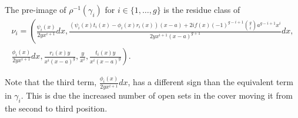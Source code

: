    \begin{prop}\label{basis22}
    The pre-image of $\rho^{-1}(\gamma_i)$ for $i \in \{1, \ldots, g\}$ is the residue class of
        \begin{multline*}
        \nu_i = \left(\frac{\psi_i(x)}{2yx^{i+1}}dx, \frac{(\psi_i(x)t_i(x) - \phi_i(x)r_i(x))(x-a) + 2if(x)(-1)^{g-i+1}\binom{g}{i} a^{g-i+1}x^i}{2yx^{i+1}(x-a)^{g+1}}dx,\right. \\\left. \frac{\phi_i(x)}{2yx^{i+1}}dx,  \frac{r_i(x)y}{x^i(x-a)^g}, \frac{y}{x^i},  \frac{t_i(x)y}{x^i(x-a)^g} \right).
        \end{multline*}
    \end{prop}
    \begin{rem}
    Note that the third term, $\frac{\phi_i(x)}{2yx^{i+1}} dx$, has a different sign than the equivalent term in $\gamma_i$.
    This is due the increased number of open sets in the cover moving it from the second to third position.
    \end{rem}
